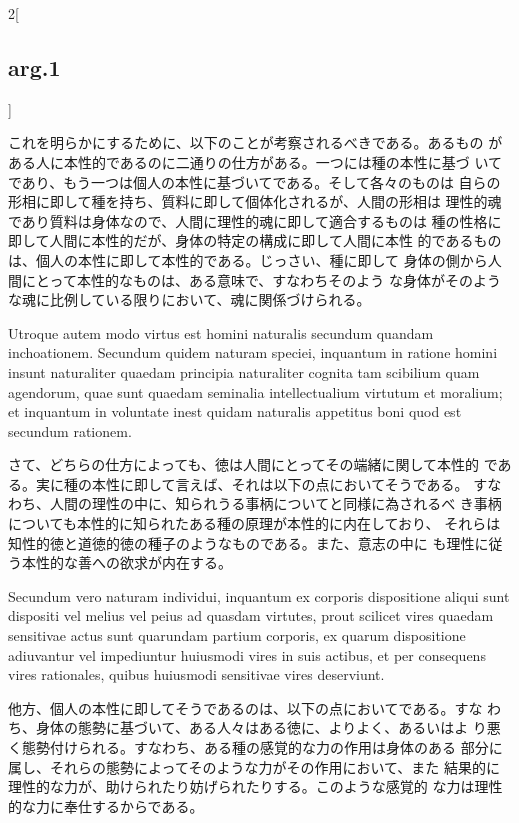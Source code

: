 \documentclass[paper=a4paper,fontsize=10pt,jafontsize=9pt,titlepage]{jlreq}
\begin{document}
\begin{paracol}{2}[\subsection{arg.1}]
\switchcolumn

これを明らかにするために、以下のことが考察されるべきである。あるもの
 がある人に本性的であるのに二通りの仕方がある。一つには種の本性に基づ
 いてであり、もう一つは個人の本性に基づいてである。そして各々のものは
 自らの形相に即して種を持ち、質料に即して個体化されるが、人間の形相は
 理性的魂であり質料は身体なので、人間に理性的魂に即して適合するものは
 種の性格に即して人間に本性的だが、身体の特定の構成に即して人間に本性
 的であるものは、個人の本性に即して本性的である。じっさい、種に即して
 身体の側から人間にとって本性的なものは、ある意味で、すなわちそのよう
 な身体がそのような魂に比例している限りにおいて、魂に関係づけられる。

\switchcolumn*

Utroque autem modo virtus est homini naturalis secundum quandam
 inchoationem. Secundum quidem naturam speciei, inquantum in ratione
 homini insunt naturaliter quaedam principia naturaliter cognita tam
 scibilium quam agendorum, quae sunt quaedam seminalia intellectualium
 virtutum et moralium; et inquantum in voluntate inest quidam
 naturalis appetitus boni quod est secundum rationem.

\switchcolumn

さて、どちらの仕方によっても、徳は人間にとってその端緒に関して本性的
 である。実に種の本性に即して言えば、それは以下の点においてそうである。
 すなわち、人間の理性の中に、知られうる事柄についてと同様に為されるべ
 き事柄についても本性的に知られたある種の原理が本性的に内在しており、
 それらは知性的徳と道徳的徳の種子のようなものである。また、意志の中に
 も理性に従う本性的な善への欲求が内在する。

\switchcolumn*

Secundum vero naturam individui, inquantum ex corporis dispositione
 aliqui sunt dispositi vel melius vel peius ad quasdam virtutes, prout
 scilicet vires quaedam sensitivae actus sunt quarundam partium
 corporis, ex quarum dispositione adiuvantur vel impediuntur huiusmodi
 vires in suis actibus, et per consequens vires rationales, quibus
 huiusmodi sensitivae vires deserviunt.

\switchcolumn

他方、個人の本性に即してそうであるのは、以下の点においてである。すな
 わち、身体の態勢に基づいて、ある人々はある徳に、よりよく、あるいはよ
 り悪く態勢付けられる。すなわち、ある種の感覚的な力の作用は身体のある
 部分に属し、それらの態勢によってそのような力がその作用において、また
 結果的に理性的な力が、助けられたり妨げられたりする。このような感覚的
 な力は理性的な力に奉仕するからである。


\end{paracol}
\end{document}

